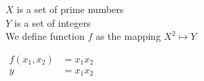 \documentclass[preview,varwidth ,multi]{standalone}
\begin{document}
\preview
$X$ is a set of prime numbers \\
$Y$ is a set of integers \\

We define function $f$ as the mapping $X^2 \mapsto Y$
\begin{center}
$
\begin{aligned}
f(x_1, x_2) &= x_1x_2 \\
y &= x_1x_2
\end{aligned}
$
\end{center}
\endpreview
\end{document}
